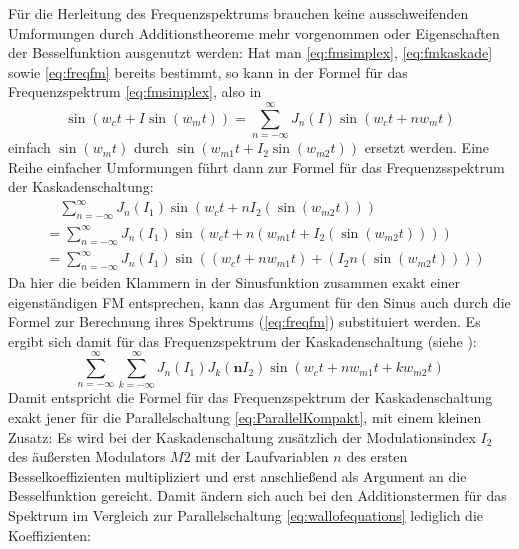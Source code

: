 Für die Herleitung des Frequenzspektrums brauchen keine ausschweifenden Umformungen durch Additionstheoreme mehr vorgenommen oder Eigenschaften der Besselfunktion ausgenutzt werden: Hat man \ref{eq:fmsimplex}, \ref{eq:fmkaskade} sowie \ref{eq:freqfm} bereits bestimmt, so kann in der Formel für das Frequenzspektrum \ref{eq:fmsimplex}, also in
\begin{equation}\label{eq:freqfm}
\sin(w_ct + I\sin(w_mt)) = \sum_{n=-\infty}^{\infty}J_n(I)\sin(w_ct+nw_mt)
\end{equation}
einfach $ \sin(w_mt) $ durch $ \sin(w_{m1}t + I_2\sin(w_{m2}t)) $ ersetzt werden. Eine Reihe einfacher Umformungen führt dann zur Formel für das Frequenzsspektrum der Kaskadenschaltung:
\begin{equation}
\begin{split}
& \quad \sum_{n=-\infty}^{\infty}J_n(I_1)\sin(w_{c}t + nI_2(\sin(w_{m2}t))) \\
&= \sum_{n=-\infty}^{\infty}J_n(I_1)\sin(w_{c}t+n(w_{m1}t + I_2(\sin(w_{m2}t)))) \\
&= \sum_{n=-\infty}^{\infty}J_n(I_1)\sin((w_{c}t+nw_{m1}t) + (I_2n(\sin(w_{m2}t))))
\end{split}
\end{equation}
Da hier die beiden Klammern in der Sinusfunktion zusammen exakt einer eigenständigen FM entsprechen, kann das Argument für den Sinus auch durch die Formel zur Berechnung ihres Spektrums (\ref{eq:freqfm}) substituiert werden. Es ergibt sich damit für das Frequenzspektrum der Kaskadenschaltung (siehe \cite{schottiWeb}):
\begin{equation}
\sum_{n=-\infty}^{\infty}\sum_{k=-\infty}^{\infty}J_n(I_1)J_k(\mathbf{n}I_2)\sin(w_{c}t+nw_{m1}t + kw_{m2}t)
\end{equation}
Damit entspricht die Formel für das Frequenzspektrum der Kaskadenschaltung exakt jener für die Parallelschaltung \ref{eq:ParallelKompakt}, mit einem kleinen Zusatz: Es wird bei der Kaskadenschaltung zusätzlich der Modulationsindex $ I_2 $ des äußersten Modulators $M2$ mit der Laufvariablen $n$ des ersten Besselkoeffizienten multipliziert und erst anschließend als Argument an die Besselfunktion gereicht. Damit ändern sich auch bei den Additionstermen für das Spektrum im Vergleich zur Parallelschaltung \ref{eq:wallofequations} lediglich die Koeffizienten:
